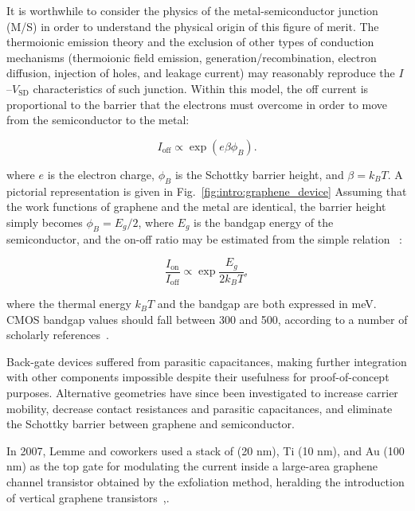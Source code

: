 It is worthwhile to consider the physics of the metal-semiconductor junction (M/S) in order to understand the physical origin of this figure of merit. The thermoionic emission theory and the exclusion of other types of conduction mechanisms (thermoionic field emission, generation/recombination, electron diffusion, injection of holes, and leakage current) may reasonably reproduce the $I$--$V_\textrm{SD}$ characteristics of such junction. Within this model, the off current is proportional to the barrier that the electrons must overcome in order to move from the semiconductor to the metal:

\begin{equation}
    I_\textrm{off}\propto\exp{(e\beta\phi_B)}.
\end{equation}

where $e$ is the electron charge, $\phi_B$ is the Schottky barrier height, and $\beta=k_BT$. A pictorial representation is given in Fig.~\ref{fig:intro:graphene_device}
Assuming that the work functions of graphene and the metal are identical, the barrier height simply becomes $\phi_B = E_g/2$, where $E_g$ is the bandgap energy of the semiconductor, and the on-off ratio may be estimated from the simple relation ~\cite{kim2011role}:

\begin{equation}\label{eq:bandgap_current_ratio}
    \frac{I_\textrm{on}}{I_\textrm{off}}\propto\exp{\frac{E_g}{2k_BT}},
\end{equation}

where the thermal energy $k_BT$ and the bandgap are both expressed in meV. \Gls{CMOS} bandgap values should fall between 300 and 500, according to a number of scholarly references~\cite{schwierz2010graphene, reddy2011graphene}.

Back-gate devices suffered from parasitic capacitances, making further integration with other components impossible despite their usefulness for proof-of-concept purposes. Alternative geometries have since been investigated to increase carrier mobility, decrease contact resistances and parasitic capacitances, and eliminate the Schottky barrier between graphene and semiconductor.

In 2007, Lemme and coworkers used a stack of  (20 nm), Ti (10 nm), and Au (100 nm) as the top gate for modulating the current inside a large-area graphene channel transistor obtained by the exfoliation method, heralding the introduction of vertical graphene transistors~\cite{lemme2007graphene},.

